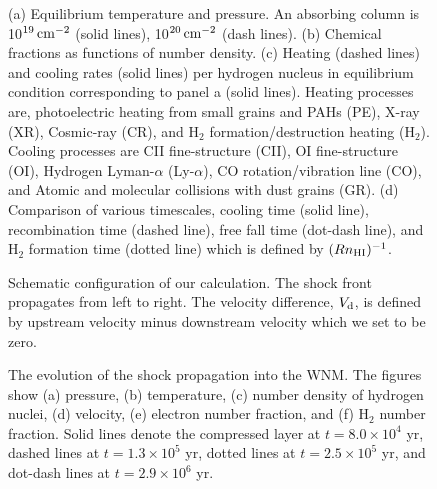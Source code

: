 \begin{figure}[htbp]

\caption{(a) Equilibrium temperature and pressure. 
An absorbing column is 10$^{19}\, {\rm cm^{-2}}$ (solid lines),
10$^{20}\, {\rm cm^{-2}}$ (dash lines). 
(b) Chemical fractions as functions of number density. 
(c) Heating (dashed lines) and cooling rates (solid lines) per hydrogen
 nucleus in equilibrium condition corresponding to panel a (solid lines).
Heating processes are,
photoelectric heating from small grains and PAHs (PE),
X-ray (XR),
Cosmic-ray (CR), and
H$_2$ formation/destruction heating (H$_2$).
Cooling processes are
CII fine-structure (CII),
OI fine-structure (OI), 
Hydrogen Lyman-$\alpha$ (Ly-$\alpha$),
CO rotation/vibration line (CO), and
Atomic and molecular collisions with dust grains (GR).
(d) Comparison of various timescales,
cooling time (solid line), 
recombination time (dashed line), 
free fall time (dot-dash line),
and H$_2$ formation time (dotted line) 
which is defined by $(Rn_{\rm HI})^{-1}$.} 
\label{fig:equilibrium}
\end{figure}

\begin{figure}[htbp]
\caption{Schematic configuration of our calculation.
The shock front propagates from left to right.
The velocity difference, $V_{\rm d}$, is defined by 
upstream velocity minus downstream velocity which we set to be zero.}
\label{fig:configure}
\end{figure}

\begin{figure}[htbp]


\caption{The evolution of the shock propagation into the WNM.
The figures show (a) pressure, (b) temperature,
(c) number density of hydrogen nuclei,
(d) velocity, (e) electron number fraction,
and (f) H$_2$ number fraction.
Solid lines denote the compressed layer at $t=8.0 \times 10^4$ yr,
dashed lines at $t=1.3 \times 10^5$ yr,
dotted lines at $t=2.5 \times 10^5$ yr, 
and dot-dash lines at $t=2.9 \times 10^6$ yr.}
\label{fig:WNM Layer}
\end{figure}

